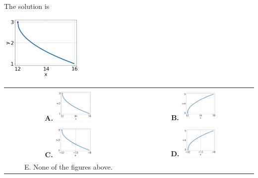 \documentclass{extbook}[14pt]
\begin{document}
 
 The solution is  
 \begin{center} \includegraphics[width=0.3\textwidth]{../Figures/radicalEquationToGraphCA.png} \end{center}\begin{tabular}{|c|c|} 
\hline 
 & \tabularnewline 
 \textbf{A.} \includegraphics[width=0.3\textwidth]{../Figures/radicalEquationToGraphCA.png} & \textbf{B.} \includegraphics[width=0.3\textwidth]{../Figures/radicalEquationToGraphAA.png} \tabularnewline 
\hline 
 & \tabularnewline 
 \textbf{C.} \includegraphics[width=0.3\textwidth]{../Figures/radicalEquationToGraphBA.png} & \textbf{D.} \includegraphics[width=0.3\textwidth]{../Figures/radicalEquationToGraphDA.png} \tabularnewline 
\hline 
 E. None of the figures above. & \tabularnewline 
\hline 
 \end{tabular} 
 
\end{document}
